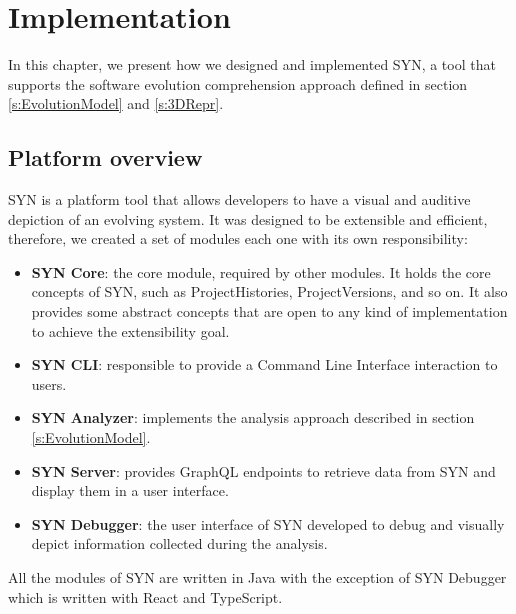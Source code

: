 
\chapter[Implementation]{Implementation}
\graphicspath{ {images/implementation} }
In this chapter, we present how we designed and implemented SYN, a tool that supports the software evolution comprehension approach 
defined in section \ref{s:EvolutionModel} and \ref{s:3DRepr}. 



\section{Platform overview}

SYN is a platform tool that allows developers to have a visual and auditive depiction of an evolving system. 
It was designed to be extensible and efficient, therefore, we created a set of modules each one with its own responsibility:
\begin{itemize}
    \item \textbf{SYN Core}: the core module, required by other modules. It holds the core concepts of SYN, such as ProjectHistories, ProjectVersions, and so on. It also provides some abstract concepts that are open to any kind of implementation to achieve the extensibility goal.
    \item \textbf{SYN CLI}: responsible to provide a Command Line Interface interaction to users.
    \item \textbf{SYN Analyzer}: implements the analysis approach described in section \ref{s:EvolutionModel}. 
    \item \textbf{SYN Server}: provides GraphQL endpoints to retrieve data from SYN and display them in a user interface. 
    \item \textbf{SYN Debugger}: the user interface of SYN developed to debug and visually depict information collected during the analysis. 
\end{itemize}

All the modules of SYN are written in Java with the exception of SYN Debugger which is written with React and TypeScript. 

